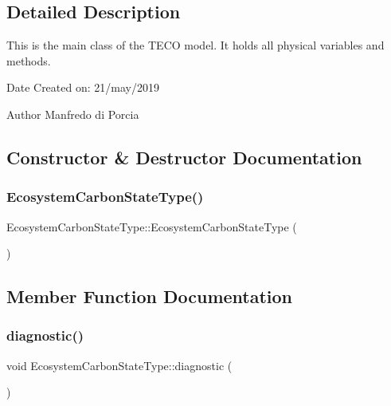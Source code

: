 \subsection{Detailed Description}
This is the main class of the T\+E\+CO model. It holds all physical variables and methods. 

\begin{DoxyDate}{Date}
Created on\+: 21/may/2019 
\end{DoxyDate}
\begin{DoxyAuthor}{Author}
Manfredo di Porcia 
\end{DoxyAuthor}


\subsection{Constructor \& Destructor Documentation}
\mbox{\label{class_ecosystem_carbon_state_type_a88c8eda06ce5e4bd306220280718939a}} 
\subsubsection{\texorpdfstring{Ecosystem\+Carbon\+State\+Type()}{EcosystemCarbonStateType()}}
{\footnotesize\ttfamily Ecosystem\+Carbon\+State\+Type\+::\+Ecosystem\+Carbon\+State\+Type (\begin{DoxyParamCaption}{ }\end{DoxyParamCaption})\hspace{0.3cm}{\ttfamily [inline]}}



\subsection{Member Function Documentation}
\mbox{\label{class_ecosystem_carbon_state_type_af3682294ea4888ea45404b675e184bd0}} 
\subsubsection{\texorpdfstring{diagnostic()}{diagnostic()}}
{\footnotesize\ttfamily void Ecosystem\+Carbon\+State\+Type\+::diagnostic (\begin{DoxyParamCaption}{ }\end{DoxyParamCaption})}

